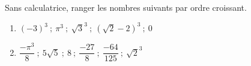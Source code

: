 \begin{exo}{}
	Sans calculatrice, ranger les nombres suivants par ordre croissant.
	\begin{enumerate}[itemsep=2mm]
		\item $(-3)^3 \ ; \ \pi^3 \ ; \ \sqrt{3}^3 \ ; \ (\sqrt{2} - 2)^3 \ ; \ 0$
		\item $\dfrac{-\pi^3}{8} \ ; \ 5\sqrt{5} \ ; \ 8 \ ; \ \dfrac{-27}{8} \ ; \ \dfrac{-64}{125} \ ; \ \sqrt{2}^3$
	\end{enumerate}
\end{exo}
